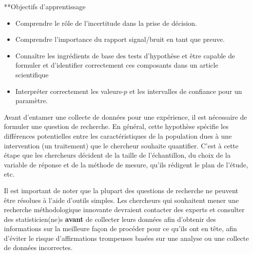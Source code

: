 \documentclass[
  11pt,
  letterpaper,
]{scrbook}
\providecommand{\tightlist}{%
  \setlength{\itemsep}{0pt}\setlength{\parskip}{0pt}}\usepackage{longtable,booktabs,array}
\theoremstyle{definition}
\theoremstyle{definition}
\theoremstyle{remark}
\begin{document}
\begin{tcolorbox}[enhanced jigsaw, colframe=quarto-callout-important-color-frame, bottomrule=.15mm, opacitybacktitle=0.6, title=\textcolor{quarto-callout-important-color}{\faExclamation}\hspace{0.5em}{Important}, opacityback=0, left=2mm, breakable, toptitle=1mm, toprule=.15mm, colbacktitle=quarto-callout-important-color!10!white, bottomtitle=1mm, coltitle=black, titlerule=0mm, leftrule=.75mm, arc=.35mm, rightrule=.15mm, colback=white]

**Objectifs d'apprentissage

\begin{itemize}
\tightlist
\item
  Comprendre le rôle de l'incertitude dans la prise de décision.
\item
  Comprendre l'importance du rapport signal/bruit en tant que preuve.
\item
  Connaître les ingrédients de base des tests d'hypothèse et être
  capable de formuler et d'identifier correctement ces composants dans
  un article scientifique
\item
  Interpréter correctement les valeurs-\(p\) et les intervalles de
  confiance pour un paramètre.
\end{itemize}

\end{tcolorbox}

Avant d'entamer une collecte de données pour une expérience, il est
nécessaire de formuler une question de recherche. En général, cette
hypothèse spécifie les différences potentielles entre les
caractéristiques de la population dues à une intervention (un
traitement) que le chercheur souhaite quantifier. C'est à cette étape
que les chercheurs décident de la taille de l'échantillon, du choix de
la variable de réponse et de la méthode de mesure, qu'ils rédigent le
plan de l'étude, etc.

Il est important de noter que la plupart des questions de recherche ne
peuvent être résolues à l'aide d'outils simples. Les chercheurs qui
souhaitent mener une recherche méthodologique innovante devraient
contacter des experts et consulter des statisticien(ne)s \textbf{avant}
de collecter leurs données afin d'obtenir des informations sur la
meilleure façon de procéder pour ce qu'ils ont en tête, afin d'éviter le
risque d'affirmations trompeuses basées sur une analyse ou une collecte
de données incorrectes.
\end{document}
